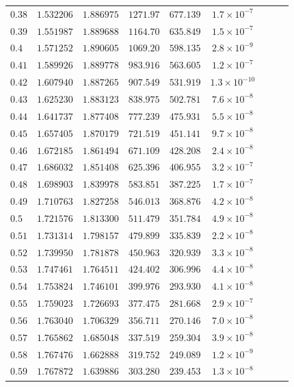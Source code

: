 \documentclass[12pt]{extarticle}
\theoremstyle{plain}
\theoremstyle{remark}
\begin{document}
\begin{longtable}{lcccccccc}
$0.38$ & $1.532206$ & $1.886975$ & $1271.97$ & $677.139$ & $1.7\times10^{-7}$ \\
$0.39$ & $1.551987$ & $1.889688$ & $1164.70$ & $635.849$ & $1.5\times10^{-7}$ \\
$0.4$ & $1.571252$ & $1.890605$ & $1069.20$ & $598.135$ & $2.8\times10^{-9}$ \\
$0.41$ & $1.589926$ & $1.889778$ & $983.916$ & $563.605$ & $1.2\times10^{-7}$ \\
$0.42$ & $1.607940$ & $1.887265$ & $907.549$ & $531.919$ & $1.3\times10^{-10}$ \\
$0.43$ & $1.625230$ & $1.883123$ & $838.975$ & $502.781$ & $7.6\times10^{-8}$ \\
$0.44$ & $1.641737$ & $1.877408$ & $777.239$ & $475.931$ & $5.5\times10^{-8}$ \\
$0.45$ & $1.657405$ & $1.870179$ & $721.519$ & $451.141$ & $9.7\times10^{-8}$ \\
$0.46$ & $1.672185$ & $1.861494$ & $671.109$ & $428.208$ & $2.4\times10^{-8}$ \\
$0.47$ & $1.686032$ & $1.851408$ & $625.396$ & $406.955$ & $3.2\times10^{-7}$ \\
$0.48$ & $1.698903$ & $1.839978$ & $583.851$ & $387.225$ & $1.7\times10^{-7}$ \\
$0.49$ & $1.710763$ & $1.827258$ & $546.013$ & $368.876$ & $4.2\times10^{-8}$ \\
$0.5$ & $1.721576$ & $1.813300$ & $511.479$ & $351.784$ & $4.9\times10^{-8}$ \\
$0.51$ & $1.731314$ & $1.798157$ & $479.899$ & $335.839$ & $2.2\times10^{-8}$ \\
$0.52$ & $1.739950$ & $1.781878$ & $450.963$ & $320.939$ & $3.3\times10^{-8}$ \\
$0.53$ & $1.747461$ & $1.764511$ & $424.402$ & $306.996$ & $4.4\times10^{-8}$ \\
$0.54$ & $1.753824$ & $1.746101$ & $399.976$ & $293.930$ & $4.1\times10^{-8}$ \\
$0.55$ & $1.759023$ & $1.726693$ & $377.475$ & $281.668$ & $2.9\times10^{-7}$ \\
$0.56$ & $1.763040$ & $1.706329$ & $356.711$ & $270.146$ & $7.0\times10^{-8}$ \\
$0.57$ & $1.765862$ & $1.685048$ & $337.519$ & $259.304$ & $3.9\times10^{-8}$ \\
$0.58$ & $1.767476$ & $1.662888$ & $319.752$ & $249.089$ & $1.2\times10^{-9}$ \\
$0.59$ & $1.767872$ & $1.639886$ & $303.280$ & $239.453$ & $1.3\times10^{-8}$ \\

\end{longtable}
\end{document}
